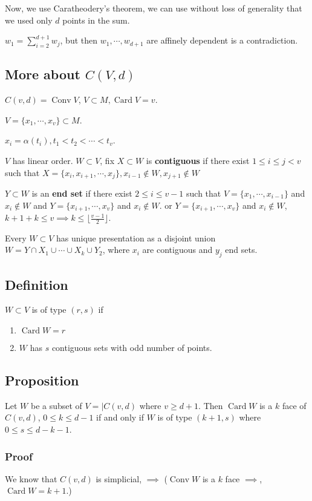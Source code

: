 \documentclass[11pt]{article}
\def\conv{\operatorname{Conv}}
\def\card{\operatorname{Card}}
\begin{document}
{{Now, we use Caratheodery's theorem, we can use without loss of generality
that we used only \(d\) points in the sum.

\(w_1 = \sum_{i=2}^{d+1} w_j\), but then \(w_1, \cdots, w_{d+1}\) are affinely
dependent is a contradiction.
\subsection{More about \(C(V, d)\)}
\label{sec:org87291e6}
\(C(v, d) = \conv V\), \(V \subset M, \card V = v\).

\(V = \{x_1, \cdots, x_v\} \subset M\).

\(x_i = \alpha(t_i), t_1 < t_2 < \cdots < t_v\).

\(V\) has linear order. \(W \subset V\), fix \(X \subset W\) is \textbf{contiguous} if
there exist \(1 \le i \le j < v\) such that \(X = \{x_i, x_{i+1}, \cdots ,x_j\},
   x_{i-1}\notin W, x_{j+1} \notin W\)

\(Y \subset W\) is an \textbf{end set} if there exist \(2 \le i \le v-1\) such that \(V =
   \{x_1, \cdots, x_{i-1}\}\) and \(x_i \notin W\) and \(Y = \{x_{i+1}, \cdots,
   x_v\}\) and \(x_i \notin W\). or \(Y = \{x_{i+1}, \cdots, x_v\}\) and \(x_i \notin
   W\), \(k+1 + k \le v \implies k \le \lfloor \frac{v-1}{2}\rfloor\).

Every \(W \subset V\) has unique presentation as a disjoint union \(W = Y\cap
   X_1 \cup \cdots \cup X_k \cup Y_2\), where \(x_i\) are contiguous and \(y_j\) end
sets.
\subsection{Definition}
\label{sec:orgf6838ff}
\(W \subset V\) is of type \((r, s)\) if 

\begin{enumerate}
\item \(\card W = r\)
\item \(W\) has \(s\) contiguous sets with odd number of points.
\end{enumerate}
\subsection{Proposition}
\label{sec:org66ed822}
Let \(W\) be a subset of \(V = \vert C(v, d)\) where \(v \ge d + 1\). Then \(\card
   W\) is a \(k\) face of \(C(v, d)\), \(0 \le k \le d-1\) if and only if \(W\) is of
type \((k+1, s)\) where \(0 \le s \le d - k -1\).
\subsubsection{Proof}
\label{sec:orgf0b7dc1}
We know that \(C(v, d)\) is simplicial, \(\implies\) (\(\conv W\) is a \(k\) face
\(\implies\), \(\card W = k+1\).)

}}
\end{document}
